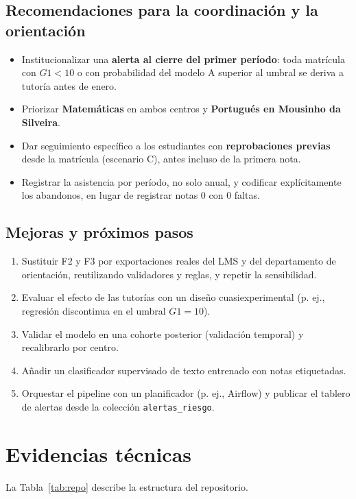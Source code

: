 \documentclass[11pt,a4paper]{article}
\begin{document}
\subsection{Recomendaciones para la coordinación y la orientación}
\begin{itemize}
\item Institucionalizar una \textbf{alerta al cierre del primer período}: toda matrícula con $G1<10$ o
con probabilidad del modelo A superior al umbral se deriva a tutoría antes de enero.
\item Priorizar \textbf{Matemáticas} en ambos centros y \textbf{Portugués en Mousinho da Silveira}.
\item Dar seguimiento específico a los estudiantes con \textbf{reprobaciones previas} desde la
matrícula (escenario C), antes incluso de la primera nota.
\item Registrar la asistencia por período, no solo anual, y codificar explícitamente los abandonos, en
lugar de registrar notas 0 con 0 faltas.
\end{itemize}

\subsection{Mejoras y próximos pasos}
\begin{enumerate}
\item Sustituir F2 y F3 por exportaciones reales del LMS y del departamento de orientación, reutilizando validadores y reglas, y repetir la sensibilidad.
\item Evaluar el efecto de las tutorías con un diseño cuasiexperimental (p. ej., regresión discontinua en el umbral $G1 = 10$).
\item Validar el modelo en una cohorte posterior (validación temporal) y recalibrarlo por centro.
\item Añadir un clasificador supervisado de texto entrenado con notas etiquetadas.
\item Orquestar el pipeline con un planificador (p. ej., Airflow) y publicar el tablero de alertas desde la colección \texttt{alertas\_riesgo}.
\end{enumerate}

\section{Evidencias técnicas}
La Tabla~\ref{tab:repo} describe la estructura del repositorio.
\end{document}
